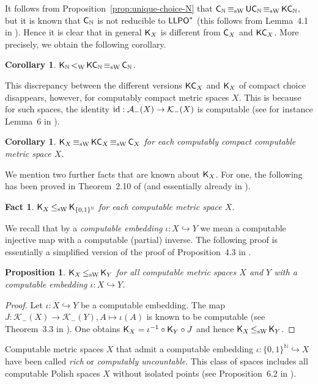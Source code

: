 \documentclass[a4paper]{amsart}
\def\AA{{\mathcal A}}
\def\KK{{\mathcal K}}
\def\IN{{\mathbb{N}}}
\def\into{\hookrightarrow}
\def\id{{\rm id}}
\def\Cantor{{\{0,1\}^\IN}}
\def\LLPO{\text{\rm\sffamily LLPO}}
\def\C{\mbox{\rm\sffamily C}}
\def\UC{\mbox{\rm\sffamily UC}}
\def\LLPO{\mbox{\rm\sffamily LLPO}}
\def\K{\text{\rm\sffamily K}}
\def\KC{\text{\rm\sffamily KC}}
\def\leqSW{\mathop{\leq_{\mathrm{sW}}}}
\def\equivSW{\mathop{\equiv_{\mathrm{sW}}}}
\def\lW{\mathop{<_{\mathrm{W}}}}
\newtheorem{proposition}[theorem]{Proposition}
\newtheorem{fact}[theorem]{Fact}
\newtheorem{corollary}[theorem]{Corollary}
\theoremstyle{definition}
\begin{document}
It follows from Proposition~\ref{prop:unique-choice-N} that $\C_\IN\equivSW\UC_\IN\equivSW\KC_\IN$, but it is known that $\C_\IN$
is not reducible to $\LLPO^*$ (this follows from Lemma~4.1 in \cite{BG11a}). Hence it is clear
that in general $\K_X$ is different from $\C_X$ and $\KC_X$.
More precisely, we obtain the following corollary.

\begin{corollary}
$\K_\IN\lW\KC_\IN\equivSW\C_\IN$.
\end{corollary}

This discrepancy between the different versions $\KC_X$ and $\K_X$ of compact
choice disappears, however, for computably compact metric spaces $X$. 
This is because for such spaces, the identity $\id:\AA_-(X)\to\KK_-(X)$ is computable
(see for instance Lemma~6 in \cite{Bra08b}).

\begin{corollary}
\label{cor:compact-choice-metric}
$\K_X\equivSW\KC_X\equivSW\C_X$ for each computably compact computable metric space $X$.
\end{corollary}

We mention two further facts that are known about $\K_X$. For one, the following has been proved
in Theorem~2.10 of \cite{BG11a} (and essentially already in \cite{GM09}). 

\begin{fact}
\label{fact:choice-metric}
$\K_X\leqSW\K_\Cantor$ for each computable metric space $X$.
\end{fact}

We recall that by a {\em computable embedding} $\iota:X\into Y$
we mean a computable injective map with a computable (partial) inverse.
The following proof is essentially a simplified version of the proof of Proposition~4.3 in \cite{BBP}.

\begin{proposition}
\label{prop:embedding}
$\K_X\leqSW\K_Y$ for all computable metric spaces $X$ and $Y$ with a computable
embedding $\iota:X\into Y$.
\end{proposition}
\begin{proof}
Let $\iota:X\into Y$ be a computable embedding.
The map $J:\KK_-(X)\to\KK_-(Y),A\mapsto\iota(A)$ is known to be computable (see Theorem~3.3 in \cite{Wei03}).
One obtains $\K_X=\iota^{-1}\circ\K_Y\circ J$ and hence $\K_X\leqSW\K_Y$.
\end{proof}

Computable metric spaces $X$ that admit a computable embedding $\iota:\Cantor\into X$ 
have been called {\em rich} or {\em computably uncountable}.
This class of spaces includes all computable Polish spaces $X$ without isolated points
(see Proposition~6.2 in \cite{BG09}).
\end{document}
